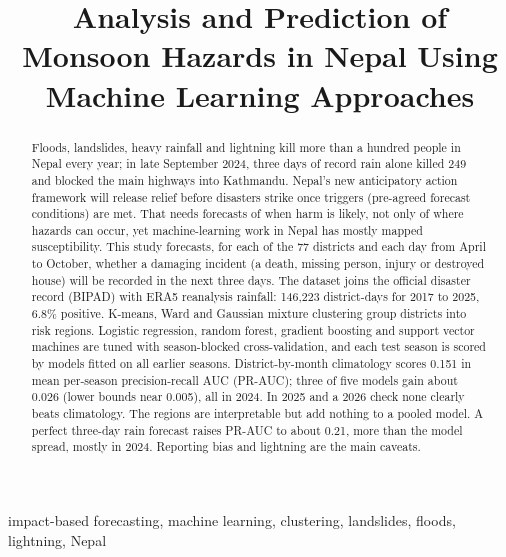 \documentclass[conference]{IEEEtran}
\newif\ifieeebold \ieeeboldfalse %
\newcommand{\abstractbody}{\ifieeebold\else\normalfont\fi}
\begin{document}
\title{Analysis and Prediction of Monsoon Hazards in Nepal Using Machine Learning Approaches}

\author{
}

\maketitle

\begin{abstract}
\abstractbody
Floods, landslides, heavy rainfall and lightning kill more than a hundred people in Nepal every year; in late September 2024, three days of record rain alone killed 249 and blocked the main highways into Kathmandu. Nepal's new anticipatory action framework will release relief before disasters strike once triggers (pre-agreed forecast conditions) are met. That needs forecasts of when harm is likely, not only of where hazards can occur, yet machine-learning work in Nepal has mostly mapped susceptibility. This study forecasts, for each of the 77 districts and each day from April to October, whether a damaging incident (a death, missing person, injury or destroyed house) will be recorded in the next three days. The dataset joins the official disaster record (BIPAD) with ERA5 reanalysis rainfall: 146,223 district-days for 2017 to 2025, 6.8\% positive. K-means, Ward and Gaussian mixture clustering group districts into risk regions. Logistic regression, random forest, gradient boosting and support vector machines are tuned with season-blocked cross-validation, and each test season is scored by models fitted on all earlier seasons. District-by-month climatology scores 0.151 in mean per-season precision-recall AUC (PR-AUC); three of five models gain about 0.026 (lower bounds near 0.005), all in 2024. In 2025 and a 2026 check none clearly beats climatology. The regions are interpretable but add nothing to a pooled model. A perfect three-day rain forecast raises PR-AUC to about 0.21, more than the model spread, mostly in 2024. Reporting bias and lightning are the main caveats.
\end{abstract}

\begin{IEEEkeywords}
\abstractbody
impact-based forecasting, machine learning, clustering, landslides, floods, lightning, Nepal
\end{IEEEkeywords}
\end{document}
